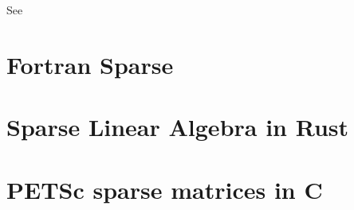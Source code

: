 See \href{https://robertsweeneyblanco.github.io/Programming_for_Mathematical_Applications/content/Sparse_Matrices/Sparse_Matrices_In_Julia.html}{}

\section{Fortran Sparse}

\section{Sparse Linear Algebra in Rust}


\section{PETSc sparse matrices in C}
